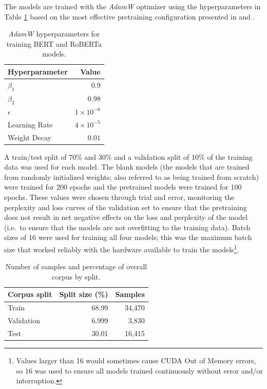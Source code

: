 \documentclass[12pt]{article}
\begin{document}
The models are trained with the \textit{AdamW} optimizer \cite{loshchilov_decoupled_2019} using the hyperparameters in Table \ref{tab:optim_params}
based on the most effective pretraining configuration presented in \cite{devlin_bert_2019} and \cite{liu_roberta_2019}.

\begin{table}[!t]
    \centering
    \begin{tabular}{l r}
        \toprule
        Hyperparameter & Value              \\
        \midrule
        $\beta_1$      & $0.9$              \\
        $\beta_2$      & $0.98$             \\
        $\epsilon$     & $1 \times 10^{-6}$ \\
        Learning Rate  & $4 \times 10^{-5}$ \\
        Weight Decay   & $0.01$             \\
        \bottomrule
    \end{tabular}
    \caption{\textit{AdamW} hyperparameters for training BERT and RoBERTa models.}
    \label{tab:optim_params}
\end{table}

A train/test split of 70\% and 30\% and a validation split of 10\% of the training data was used for each model. The blank models (the models that are
trained from randomly initialized weights; also referred to as being trained from scratch) were trained for 200 epochs and the pretrained models were
trained for 100 epochs. These values were chosen through trial and error, monitoring the perplexity and loss curves of the
validation set to ensure that the pretraining does not result in net negative effects on the loss and perplexity of the model (i.e.~to ensure that the
models are not overfitting to the training data). Batch sizes of 16 were used for training all four models; this was the maximum batch size that
worked reliably with the hardware available to train the models\footnote{Values larger than 16 would sometimes cause CUDA Out of Memory errors, so 16
    was used to ensure all models trained continuously without error and/or interruption.}.

\begin{table}
    \centering
    \begin{tabular}{l r r}
        \toprule
        Corpus split & Split size (\%) & Samples \\
        \midrule
        Train        & 68.99           & 34,470  \\
        Validation   & 6.999           & 3,830   \\
        Test         & 30.01           & 16,415  \\
        \bottomrule
    \end{tabular}
    \caption{Number of samples and percentage of overall corpus by split.}
    \label{tab:corpus_splits}
\end{table}
\end{document}
